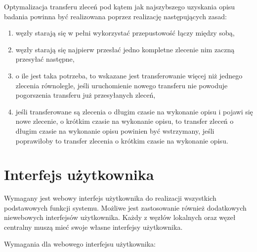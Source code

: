 \documentclass[a4paper]{report}
\begin{document}
Optymalizacja transferu zleceń pod kątem jak najszybszego uzyskania opisu badania powinna być realizowana poprzez realizację następujących zasad:
\begin{enumerate}
 \item węzły starają się w pełni wykorzystać przepustowość łączy między sobą,
 \item węzły starają się najpierw przesłać jedno kompletne zlecenie nim zaczną przesyłać następne,
 \item o ile jest taka potrzeba, to wskazane jest transferowanie więcej niż jednego zlecenia równolegle, jeśli uruchomienie nowego transferu nie powoduje pogorszenia transferu już przesyłanych zleceń,
 \item jeśli transferowane są zlecenia o długim czasie na wykonanie opisu i pojawi się nowe zlecenie, o krótkim czasie na wykonanie opisu, to transfer zleceń o długim czasie na wykonanie opisu powinien być wstrzymany, jeśli poprawiłoby to transfer zlecenia o krótkim czasie na wykonanie opisu.
\end{enumerate}

\section{Interfejs użytkownika}

Wymagany jest webowy interfejs użytkownika do realizacji wszystkich podstawowych funkcji systemu. Możliwe jest zastosowanie również dodatkowych niewebowych interfejsów użytkownika. Każdy z węzłów lokalnych oraz węzeł centralny muszą mieć swoje własne interfejsy użytkownika.

Wymagania dla webowego interfejsu użytkownika:
\end{document}

